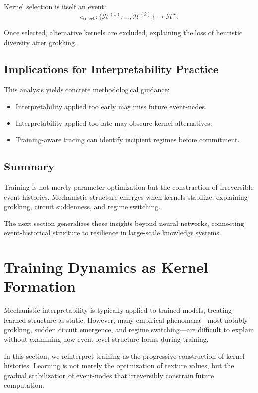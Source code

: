 \documentclass[11pt]{article}
\theoremstyle{remark}
\newcommand{\Hist}{\mathcal{H}}
\begin{document}
Kernel selection is itself an event:
\[
e_{\text{select}}: \{\Hist^{(1)}, \ldots, \Hist^{(k)}\} \to \Hist^\star.
\]

Once selected, alternative kernels are excluded, explaining the loss
of heuristic diversity after grokking.

\subsection{Implications for Interpretability Practice}

This analysis yields concrete methodological guidance:

\begin{itemize}
\item Interpretability applied too early may miss future event-nodes.
\item Interpretability applied too late may obscure kernel alternatives.
\item Training-aware tracing can identify incipient regimes before
commitment.
\end{itemize}

\subsection{Summary}

Training is not merely parameter optimization but the construction of
irreversible event-histories. Mechanistic structure emerges when
kernels stabilize, explaining grokking, circuit suddenness, and regime
switching.

The next section generalizes these insights beyond neural networks,
connecting event-historical structure to resilience in large-scale
knowledge systems.

\section{Training Dynamics as Kernel Formation}

Mechanistic interpretability is typically applied to trained models,
treating learned structure as static. However, many empirical
phenomena—most notably grokking, sudden circuit emergence, and regime
switching—are difficult to explain without examining how event-level
structure forms during training.

In this section, we reinterpret training as the progressive
construction of kernel histories. Learning is not merely the
optimization of texture values, but the gradual stabilization of
event-nodes that irreversibly constrain future computation.
\end{document}
